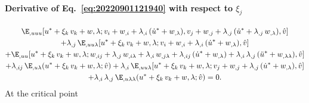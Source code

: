 \paragraph{Derivative of Eq.~\eqref{eq:20220901121940} with respect to \(\xi_j\)}
\begin{equation}
  \label{eq:20220901125230}
  \begin{gathered}[b]
    \E_{,uuu}[u^\ast + \xi_k \, v_k + w, \lambda; v_i + w_{,i} + \lambda_{,i} \, ( \dot{u}^\ast + w_{,\lambda} ), v_j + w_{,j} + \lambda_{,j} \, ( \dot{u}^\ast + \lambda_{,j} \, w_{,\lambda} ), \hat{v}]\\
    + \lambda_{,j} \, \E_{,uu\lambda}[u^\ast + \xi_k \, v_k + w, \lambda; v_i + w_{,i} + \lambda_{,i} \, ( \dot{u}^\ast + w_{,\lambda} ), \hat{v}]\\
    + \E_{,uu}[u^\ast + \xi_k \, v_k + w, \lambda; w_{,ij} + \lambda_{, j} \, w_{,i\lambda} + \lambda_{, i} \, w_{,j\lambda} + \lambda_{,ij} \, ( \dot{u}^\ast + w_{,\lambda} ) + \lambda_{,i}\, \lambda_{,j} \, ( \ddot{u}^\ast + w_{,\lambda\lambda} ), \hat{v}]\\
    + \lambda_{, ij} \, \E_{,u\lambda}(u^\ast + \xi_k \, v_k + w, \lambda; \hat{v}) + \lambda_{, i} \, \E_{,uu\lambda}[u^\ast + \xi_k \, v_k + w, \lambda; v_j + w_{,j} + \lambda_{,j} \, (\dot{u}^\ast + w_{,\lambda}), \hat{v}]\\
    + \lambda_{,i} \, \lambda_{,j} \, \E_{,u\lambda\lambda}(u^\ast + \xi_k \, v_k + w, \lambda; \hat{v})= 0.
  \end{gathered}
\end{equation}
At the critical point

